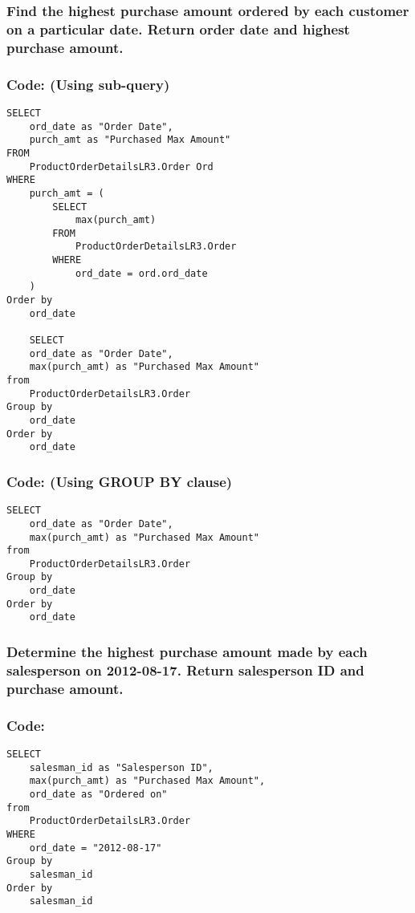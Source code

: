 \documentclass[12pt]{article}
\begin{document}
\vspace{10mm}

\subsubsection{Find the highest purchase amount ordered by each customer on a particular date. Return order date and highest purchase amount.}
\subsubsection*{Code: (Using sub-query)}
\begin{verbatim}
SELECT
    ord_date as "Order Date",
    purch_amt as "Purchased Max Amount"
FROM
    ProductOrderDetailsLR3.Order Ord
WHERE
    purch_amt = (
        SELECT
            max(purch_amt)
        FROM
            ProductOrderDetailsLR3.Order
        WHERE
            ord_date = ord.ord_date
    )
Order by
    ord_date

    SELECT
    ord_date as "Order Date",
    max(purch_amt) as "Purchased Max Amount"
from
    ProductOrderDetailsLR3.Order
Group by
    ord_date
Order by
    ord_date
\end{verbatim}
\subsubsection*{Code: (Using GROUP BY clause)}
\begin{verbatim}
SELECT
    ord_date as "Order Date",
    max(purch_amt) as "Purchased Max Amount"
from
    ProductOrderDetailsLR3.Order
Group by
    ord_date
Order by
    ord_date
\end{verbatim}



\vspace{10mm}

\subsubsection{Determine the highest purchase amount made by each salesperson on 2012-08-17. Return salesperson ID and purchase amount.}
\subsubsection*{Code:}
\begin{verbatim}
SELECT
    salesman_id as "Salesperson ID",
    max(purch_amt) as "Purchased Max Amount",
    ord_date as "Ordered on"
from
    ProductOrderDetailsLR3.Order
WHERE
    ord_date = "2012-08-17"
Group by
    salesman_id
Order by
    salesman_id
\end{verbatim}
\end{document}
